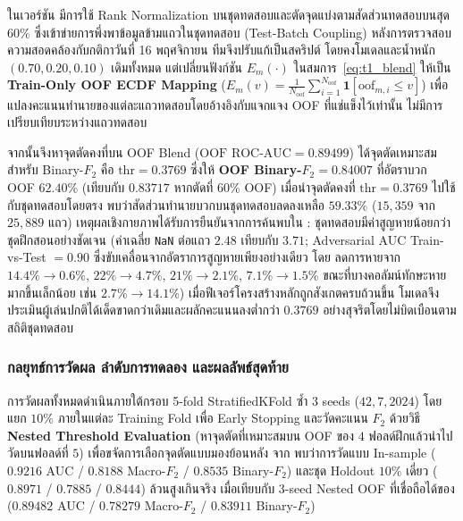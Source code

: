 \begin{decisionbox}
ในเวอร์ชัน  มีการใช้ Rank Normalization บนชุดทดสอบและตัดจุดแบ่งตามสัดส่วนทดสอบบนสุด $60\%$ ซึ่งเข้าข่ายการพึ่งพาข้อมูลข้ามแถวในชุดทดสอบ (Test-Batch Coupling) หลังการตรวจสอบความสอดคล้องกับกติกาวันที่ 16 พฤศจิกายน ทีมจึงปรับแก้เป็นสคริปต์  โดยคงโมเดลและน้ำหนัก $(0.70, 0.20, 0.10)$ เดิมทั้งหมด แต่เปลี่ยนฟังก์ชัน $E_m(\cdot)$ ในสมการ~\eqref{eq:t1_blend} ให้เป็น \textbf{Train-Only OOF ECDF Mapping} ($E_m(v) = \frac{1}{N_{\text{oof}}} \sum_{i=1}^{N_{\text{oof}}} \mathbf{1}[\text{oof}_{m,i} \le v]$) เพื่อแปลงคะแนนทำนายของแต่ละแถวทดสอบโดยอ้างอิงกับแจกแจง OOF ที่แช่แข็งไว้เท่านั้น ไม่มีการเปรียบเทียบระหว่างแถวทดสอบ

จากนั้นจึงหาจุดตัดคงที่บน OOF Blend ($\text{OOF ROC-AUC} = 0.89499$) ได้จุดตัดเหมาะสมสำหรับ Binary-$F_2$ คือ $\text{thr} = 0.3769$ ซึ่งให้ \textbf{OOF Binary-$F_2 = 0.84007$} ที่อัตราบวก OOF $62.40\%$ (เทียบกับ $0.83717$ หากตัดที่ $60\%$ OOF) เมื่อนำจุดตัดคงที่ $\text{thr} = 0.3769$ ไปใช้กับชุดทดสอบโดยตรง พบว่าสัดส่วนทำนายบวกบนชุดทดสอบลดลงเหลือ $\mathbf{59.33\%}$ ($15,359$ จาก $25,889$ แถว) เหตุผลเชิงกายภาพได้รับการยืนยันจากการค้นพบใน : ชุดทดสอบมีค่าสูญหายน้อยกว่าชุดฝึกสอนอย่างชัดเจน (ค่าเฉลี่ย \texttt{NaN} ต่อแถว $2.48$ เทียบกับ $3.71$; Adversarial AUC Train-vs-Test $= 0.90$ ซึ่งขับเคลื่อนจากอัตราการสูญหายเพียงอย่างเดียว โดย  ลดการหายจาก $14.4\% \rightarrow 0.6\%$,  $22\% \rightarrow 4.7\%$,  $21\% \rightarrow 2.1\%$,  $7.1\% \rightarrow 1.5\%$ ขณะที่บางคอลัมน์ทักษะหายมากขึ้นเล็กน้อย เช่น  $2.7\% \rightarrow 14.1\%$) เมื่อฟีเจอร์โครงสร้างหลักถูกสังเกตครบถ้วนขึ้น โมเดลจึงประเมินผู้เล่นปกติได้เด็ดขาดกว่าเดิมและผลักคะแนนลงต่ำกว่า $0.3769$ อย่างสุจริตโดยไม่บิดเบือนตามสถิติชุดทดสอบ
\end{decisionbox}

\subsubsection{กลยุทธ์การวัดผล ลำดับการทดลอง และผลลัพธ์สุดท้าย}

การวัดผลทั้งหมดดำเนินภายใต้กรอบ 5-fold StratifiedKFold ซ้ำ $3$ seeds ($42, 7, 2024$) โดยแยก $10\%$ ภายในแต่ละ Training Fold เพื่อ Early Stopping และวัดคะแนน $F_2$ ด้วยวิธี \textbf{Nested Threshold Evaluation} (หาจุดตัดที่เหมาะสมบน OOF ของ $4$ ฟอลด์ฝึกแล้วนำไปวัดบนฟอลด์ที่ $5$) เพื่อขจัดการเลือกจุดตัดแบบมองย้อนหลัง จาก  พบว่าการวัดแบบ In-sample ($0.9216$ AUC / $0.8188$ Macro-$F_2$ / $0.8535$ Binary-$F_2$) และชุด Holdout $10\%$ เดี่ยว ($0.8971$ / $0.7885$ / $0.8444$) ล้วนสูงเกินจริง เมื่อเทียบกับ 3-seed Nested OOF ที่เชื่อถือได้ของ  ($0.89482$ AUC / $0.78279$ Macro-$F_2$ / $0.83911$ Binary-$F_2$)

